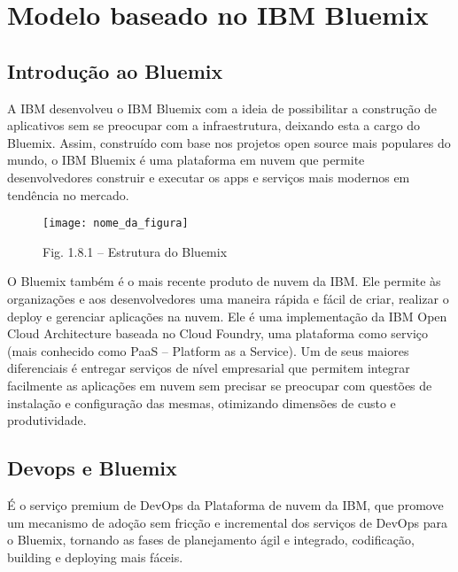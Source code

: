




\section{Modelo baseado no IBM Bluemix}

\subsection{Introdução ao Bluemix}

A IBM desenvolveu o IBM Bluemix com a ideia de possibilitar a construção de aplicativos sem se preocupar com a infraestrutura, deixando esta a cargo do Bluemix. Assim, construído com base nos projetos open source mais populares do mundo, o IBM Bluemix é uma plataforma em nuvem que permite desenvolvedores construir e executar os apps e serviços mais modernos em tendência no mercado.

\begin{figure}[!htb]
\centering
\texttt{[image: nome\_da\_figura]}
\caption{Fig. 1.8.1 – Estrutura do Bluemix}
\label{Rotulo}
\end{figure}

O Bluemix também é o mais recente produto de nuvem da IBM. Ele permite às organizações e aos desenvolvedores uma maneira rápida e fácil de criar, realizar o deploy e gerenciar aplicações na nuvem. Ele é uma implementação da IBM Open Cloud Architecture baseada no Cloud Foundry, uma plataforma como serviço (mais conhecido como PaaS – Platform as a Service). Um de seus maiores diferenciais é entregar serviços de nível empresarial que permitem integrar facilmente as aplicações em nuvem sem precisar se preocupar com questões de instalação e configuração das mesmas, otimizando dimensões de custo e produtividade.

\subsection{Devops e Bluemix}
É o serviço premium de DevOps da Plataforma de nuvem da IBM, que promove um mecanismo de adoção sem fricção e incremental dos serviços de DevOps para o Bluemix, tornando as fases de planejamento ágil e integrado, codificação, building e deploying mais fáceis.

